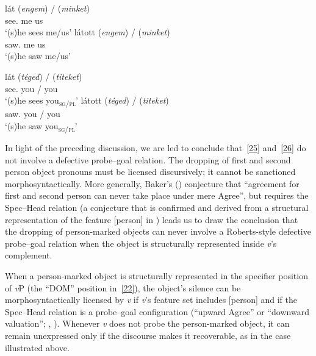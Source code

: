 \documentclass[output=paper]{langsci/langscibook}
\begin{document}
\begin{refcontext}
\begin{exe}\begin{minipage}[t]{.565\linewidth}
\ex \label{25}
    \ea \gll lát (\emph{engem}) / (\emph{minket})\\
    see.\Indef{} \phantom{(}me {} \phantom{(}us\\
    \glt \enquote*{(s)he sees me/us}
    \ex \gll látott (\emph{engem}) / (\emph{minket})\\
    saw.\Indef{} \phantom{(}me {} \phantom{(}us\\
    \glt \enquote*{(s)he saw me/us}
    \z
\end{minipage}\begin{minipage}[t]{.435\linewidth}
\ex \label{26}
    \ea \gll lát (\emph{téged}) / (\emph{titeket})\\
    see.\Indef{} \phantom{(}you\textsubscript{\Sg{}} / \phantom{(}you\textsubscript{\Pl}\\
    \glt \enquote*{(s)he sees you\textsubscript{\textsc{sg/pl}}}
    \ex \gll látott (\emph{téged}) / (\emph{titeket})\\
    saw.\Indef{} \phantom{(}you\textsubscript{\Sg{}} / \phantom{(}you\textsubscript{\Pl}\\
    \glt \enquote*{(s)he saw you\textsubscript{\textsc{sg/pl}}}
    \z
\end{minipage}\end{exe}

\noindent In light of the preceding discussion, we are led to conclude that~\eqref{25}
and~\eqref{26} do not involve a defective probe--goal relation. The dropping of
first and second person object pronouns must be licensed discursively; it
cannot be sanctioned morphosyntactically. More generally, Baker's
(\citeyear[877, fn.\ 3]{baker11}) conjecture that \enquote{agreement for first and
second person can never take place under mere Agree}, but requires the
Spec--Head relation (a conjecture that is confirmed and derived from a
structural representation of the feature [person] in
\citealt{dikkengetegratalk}) leads us to draw the conclusion that the dropping
of person-marked objects can never involve a Roberts-style defective probe--goal
relation when the object is structurally represented inside \emph{v}'s
complement.

When a person-marked object is structurally represented in the specifier
position of \emph{v}P (the \enquote{DOM} position in~\ref{22}), the object's
silence can be morphosyntactically licensed by \emph{v} if \emph{v}'s feature
set includes [person] and if the Spec--Head relation is a probe--goal
configuration (\enquote{upward Agree} or \enquote{downward valuation};
\citealt{BjoZei2019}, \citealt{premingerpolinsky}). Whenever \emph{v} does not
probe the person-marked object, it can remain unexpressed only if the discourse
makes it recoverable, as in the  case illustrated above.


\end{refcontext}
\end{document}

